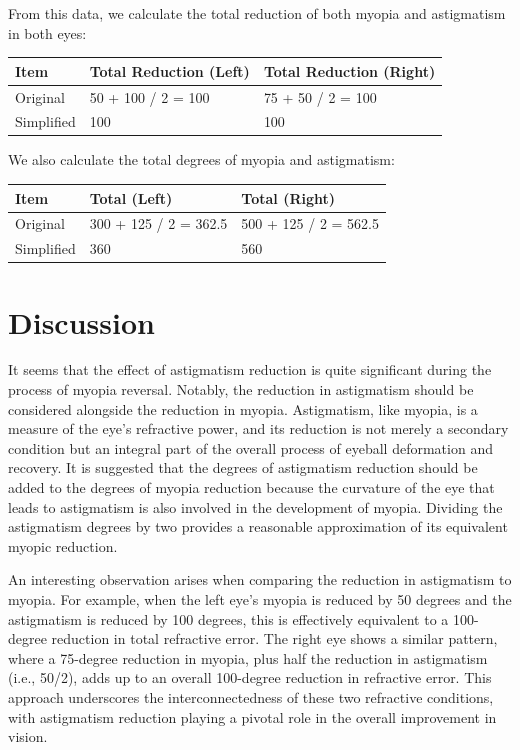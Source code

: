 \documentclass[12pt]{article}
\begin{document}
From this data, we calculate the total reduction of both myopia and astigmatism in both eyes:

\begin{table}[h!]
\centering
\begin{tabularx}{\textwidth}{|X|X|X|}
\hline
\textbf{Item} & \textbf{Total Reduction (Left)} & \textbf{Total Reduction (Right)} \\
\hline
Original & 50 + 100 / 2 = 100 & 75 + 50 / 2 = 100 \\
Simplified & 100 & 100 \\
\hline
\end{tabularx}
\end{table}

We also calculate the total degrees of myopia and astigmatism:

\begin{table}[h!]
\centering
\begin{tabularx}{\textwidth}{|X|X|X|}
\hline
\textbf{Item} & \textbf{Total (Left)} & \textbf{Total (Right)} \\
\hline
Original & 300 + 125 / 2 = 362.5 & 500 + 125 / 2 = 562.5 \\
Simplified & 360 & 560 \\
\hline
\end{tabularx}
\end{table}

\section{Discussion}
It seems that the effect of astigmatism reduction is quite significant during the process of myopia reversal. Notably, the reduction in astigmatism should be considered alongside the reduction in myopia. Astigmatism, like myopia, is a measure of the eye's refractive power, and its reduction is not merely a secondary condition but an integral part of the overall process of eyeball deformation and recovery. It is suggested that the degrees of astigmatism reduction should be added to the degrees of myopia reduction because the curvature of the eye that leads to astigmatism is also involved in the development of myopia. Dividing the astigmatism degrees by two provides a reasonable approximation of its equivalent myopic reduction.

An interesting observation arises when comparing the reduction in astigmatism to myopia. For example, when the left eye’s myopia is reduced by 50 degrees and the astigmatism is reduced by 100 degrees, this is effectively equivalent to a 100-degree reduction in total refractive error. The right eye shows a similar pattern, where a 75-degree reduction in myopia, plus half the reduction in astigmatism (i.e., 50/2), adds up to an overall 100-degree reduction in refractive error. This approach underscores the interconnectedness of these two refractive conditions, with astigmatism reduction playing a pivotal role in the overall improvement in vision.
\end{document}
